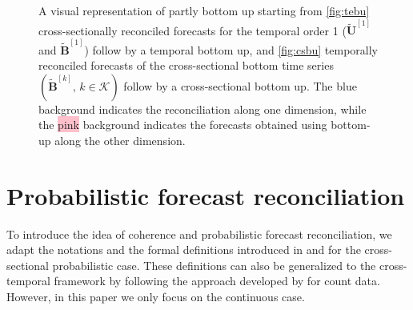 \documentclass[a4paper,11pt]{article}
\newcommand{\Bvet}{\bm{B}}
\newcommand{\Uvet}{\bm{U}}
\theoremstyle{definition}
\begin{document}
\begin{figure}[!hbt]
\begin{subfigure}[b]{0.49\textwidth}
{}
		\label{fig:csbu}
	\end{subfigure}
	\vspace{-1cm}
	\caption{A visual representation of partly bottom up starting from \eqref{fig:tebu} cross-sectionally reconciled forecasts for the temporal order 1 ($\widetilde{\Uvet}^{[1]}$ and $\widetilde{\Bvet}^{[1]}$) follow by a temporal bottom up, and \eqref{fig:csbu} temporally reconciled forecasts of the cross-sectional bottom time series $(\widetilde{\Bvet}^{[k]}, \, k\in \mathcal{K})$ follow by a cross-sectional bottom up. The \colorbox{mybluehl}{blue} background indicates the reconciliation along one dimension, while the \colorbox{pink}{pink} background indicates the forecasts obtained using bottom-up along the other dimension.}
	\label{fig:bigBU}
\end{figure}

\section{Probabilistic forecast reconciliation}\label{sec:prob}

To introduce the idea of coherence and probabilistic forecast reconciliation, we adapt the notations and the formal definitions introduced in \cite{wickramasuriya2021b} and \cite{panagiotelis2023} for the cross-sectional probabilistic case. These definitions can also be generalized to the cross-temporal framework by following the approach developed by \cite{corani2022} for count data. However, in this paper we only focus on the continuous case.
\end{document}
